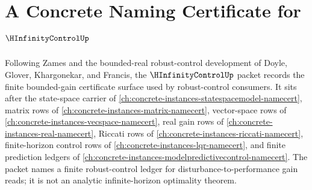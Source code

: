 \chapter{A Concrete Naming Certificate for $\HInfinityControlUp$}
\label{ch:concrete-instances-h-infinity-control-namecert}

Following Zames and the bounded-real robust-control development of Doyle, Glover, Khargonekar, and Francis, the $\HInfinityControlUp$ packet records the finite bounded-gain certificate surface used by robust-control consumers. It sits after the state-space carrier of \autoref{ch:concrete-instances-statespacemodel-namecert}, matrix rows of \autoref{ch:concrete-instances-matrix-namecert}, vector-space rows of \autoref{ch:concrete-instances-vecspace-namecert}, real gain rows of \autoref{ch:concrete-instances-real-namecert}, Riccati rows of \autoref{ch:concrete-instances-riccati-namecert}, finite-horizon control rows of \autoref{ch:concrete-instances-lqr-namecert}, and finite prediction ledgers of \autoref{ch:concrete-instances-modelpredictivecontrol-namecert}. The packet names a finite robust-control ledger for disturbance-to-performance gain reads; it is not an analytic infinite-horizon optimality theorem.

